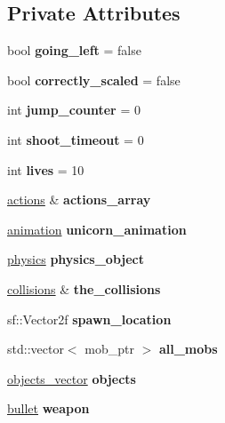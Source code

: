 \subsection*{Private Attributes}
\begin{DoxyCompactItemize}
\item 
\mbox{\label{classunicorn_a4a032891da1aa855b0b46c6e0b969a35}} 
bool {\bfseries going\+\_\+left} = false
\item 
\mbox{\label{classunicorn_ac427ce120e919fe962664585903328af}} 
bool {\bfseries correctly\+\_\+scaled} = false
\item 
\mbox{\label{classunicorn_a7f4c9e68841d896da696132113602019}} 
int {\bfseries jump\+\_\+counter} = 0
\item 
\mbox{\label{classunicorn_a7673cbdfe14f719f710df4b324f74484}} 
int {\bfseries shoot\+\_\+timeout} = 0
\item 
\mbox{\label{classunicorn_ab0462e46c2393f0bc0f5b2faa0b7b091}} 
int {\bfseries lives} = 10
\item 
\mbox{\label{classunicorn_a1cc767e234ec6d55ca0b576747f8d7d7}} 
\hyperlink{drawable_8hpp_a38f93e4749e0d65d51360c429766d212}{actions} \& {\bfseries actions\+\_\+array}
\item 
\mbox{\label{classunicorn_a0d6df4ae413adcf9307c2f36e9c1d51b}} 
\hyperlink{classanimation}{animation} {\bfseries unicorn\+\_\+animation}
\item 
\mbox{\label{classunicorn_accaf554299ce27905fa8c47f602b0e98}} 
\hyperlink{classphysics}{physics} {\bfseries physics\+\_\+object}
\item 
\mbox{\label{classunicorn_a77b6bd58d4bd308c55a530c50fdcce41}} 
\hyperlink{drawable_8hpp_a7e1a7f34f6d09dabb4cdafd6e4118603}{collisions} \& {\bfseries the\+\_\+collisions}
\item 
\mbox{\label{classunicorn_ab16638b1ce0d1a7a0da9ecffc6370e8c}} 
sf\+::\+Vector2f {\bfseries spawn\+\_\+location}
\item 
\mbox{\label{classunicorn_a63615aa4b273f506eee7b9f91fec28ab}} 
std\+::vector$<$ mob\+\_\+ptr $>$ {\bfseries all\+\_\+mobs}
\item 
\mbox{\label{classunicorn_a674ef0598aba065ad1c3c746a2c2296e}} 
\hyperlink{drawable_8hpp_a6c0fdb1dfd0c34dbbdbb5dcd3c608b07}{objects\+\_\+vector} {\bfseries objects}
\item 
\mbox{\label{classunicorn_a3e51a9e196533b27304f21eb26d8f4ba}} 
\hyperlink{classbullet}{bullet} {\bfseries weapon}
\end{DoxyCompactItemize}
